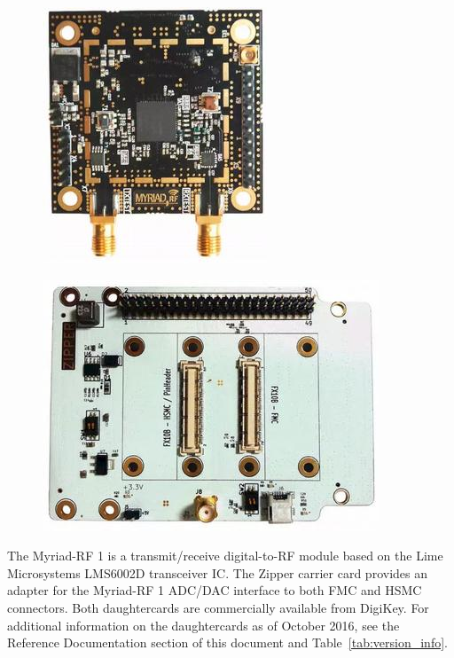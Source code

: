 \documentclass{article}
\begin{document}
	\begin{figure}[ht]
	\centering
		\begin{minipage}{.5\textwidth}
			\centering\includegraphics[width=0.65\linewidth]{myriadrf}
			\label{fig:myriadrf}
		\end{minipage}%
		\begin{minipage}{.5\textwidth}
			\centering\includegraphics[width=1.0\linewidth]{zipper}
			\label{fig:zipper}
		\end{minipage}
	\end{figure}
\noindent The Myriad-RF 1 is a transmit/receive digital-to-RF module based on the Lime Microsystems LMS6002D transceiver IC. The Zipper carrier card provides an adapter for the Myriad-RF 1 ADC/DAC interface to both FMC and HSMC connectors. Both daughtercards are commercially available from DigiKey. For additional information on the daughtercards as of October 2016, see the Reference Documentation section of this document and Table~\ref{tab:version_info}.
\end{document}
